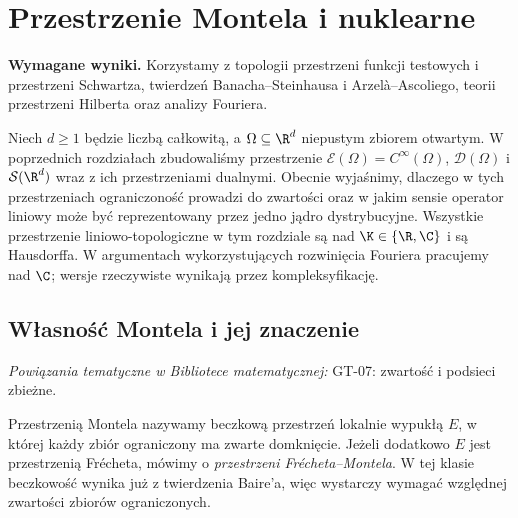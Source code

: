 \setcounter{section}{22}
\section{Przestrzenie Montela i nuklearne}
\label{sec:montel-nuklearne23}

\providecommand{\atlasref}[2]{#2}


\noindent\textbf{Wymagane wyniki.} Korzystamy z topologii
przestrzeni funkcji testowych i przestrzeni Schwartza,
twierdzeń Banacha--Steinhausa i Arzelà--Ascoliego,
teorii przestrzeni Hilberta oraz analizy Fouriera.
\medskip

Niech $d\ge1$ będzie liczbą całkowitą, a $\Omega\subseteq\R^d$
niepustym zbiorem otwartym. W poprzednich rozdziałach
zbudowaliśmy przestrzenie
$\mathcal E(\Omega)=C^\infty(\Omega)$,
$\mathcal D(\Omega)$ i $\mathcal S(\R^d)$ wraz z ich
przestrzeniami dualnymi. Obecnie wyjaśnimy, dlaczego w tych
przestrzeniach ograniczoność prowadzi do zwartości oraz w jakim
sensie operator liniowy może być reprezentowany przez jedno jądro
dystrybucyjne. Wszystkie przestrzenie liniowo-topologiczne w tym
rozdziale są nad $\K\in\{\R,\C\}$ i są Hausdorffa. W argumentach
wykorzystujących rozwinięcia Fouriera pracujemy nad $\C$;
wersje rzeczywiste wynikają przez kompleksyfikację.

\subsection{Własność Montela i jej znaczenie}

\noindent\emph{Powiązania tematyczne w Bibliotece matematycznej:} \atlasref{GT-07::thm:topog-zwartosc-sieci}{GT-07: zwartość i podsieci zbieżne}.


\begin{definicja}
\label{def:montel23}
Przestrzenią Montela nazywamy beczkową przestrzeń lokalnie wypukłą
$E$, w której każdy zbiór ograniczony ma zwarte domknięcie.
Jeżeli dodatkowo $E$ jest przestrzenią Frécheta, mówimy o
\emph{przestrzeni Frécheta--Montela}. W tej klasie beczkowość
wynika już z twierdzenia Baire'a, więc wystarczy wymagać
względnej zwartości zbiorów ograniczonych.
\end{definicja}

